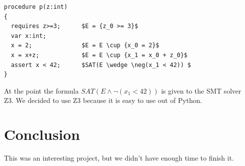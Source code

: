 \documentclass[paper=a4, fontsize=12pt]{scrartcl}
\begin{document}
\FloatBarrier
\begin{lstlisting}[caption=Formula generation, label=lst:ver, mathescape]
procedure p(z:int) 
{ 
  requires z>=3;      $E = {z_0 >= 3}$ 
  var x:int; 
  x = 2;              $E = E \cup {x_0 = 2}$ 
  x = x+z;            $E = E \cup {x_1 = x_0 + z_0}$ 
  assert x < 42;      $SAT(E \wedge \neg(x_1 < 42)) $ 
} 
\end{lstlisting}

At the point the formula $SAT(E \wedge \neg(x_1 < 42))$ is given to the SMT solver Z3. We decided to use Z3 because it is easy to use out of Python.


\section{Conclusion}
This was an interesting project, but we didn't have enough time to finish it. 


 

\end{document}
